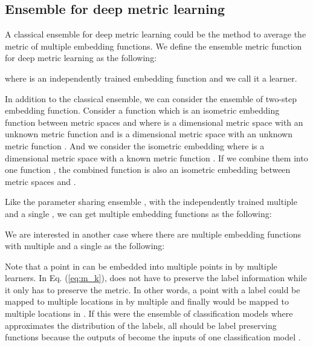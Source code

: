 \documentclass[runningheads]{llncs}
\begin{document}
\subsection{Ensemble for deep metric learning}
\label{sec:ensemble_dml}
\vspace{-1mm}

A classical ensemble for deep metric learning could be the method to average the metric of multiple embedding functions.
We define the ensemble metric function  for deep metric learning as the following:
\vspace{-3mm}

where  is an independently trained embedding function and we call it a learner.

In addition to the classical ensemble, we can consider the ensemble of two-step embedding function.
Consider a function  which is an isometric embedding function
 between metric spaces  and  where  is a 
 dimensional metric space with an unknown metric function  and 
 is a  dimensional metric space with an unknown metric function .
And we consider the isometric embedding  where
  is a  dimensional metric space with a known metric function .
If we combine them into one function ,
 the combined function is also an isometric embedding 
 between metric spaces  and .

Like the parameter sharing ensemble \cite{lee2015m}, with the independently trained multiple
  and a single , we can get multiple embedding functions  as the following:
\vspace{-2mm}


We are interested in another case where there are multiple embedding functions  with multiple  and a single  as the following:
\vspace{-2mm}


Note that a point in  can be embedded into multiple points in  by multiple learners.
In Eq. (\ref{eq:m_k}),  does not have to preserve the label information while it only has to preserve the metric.
In other words, a point with a label could be mapped to multiple locations in  by multiple  and
 finally would be mapped to multiple locations in .
If this were the ensemble of classification models where  approximates the distribution of the labels,
 all  should be label preserving functions because the outputs of 
 become the inputs of one classification model .
\end{document}
